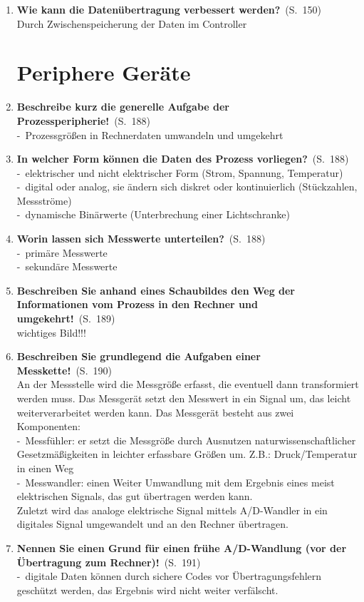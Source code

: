 \documentclass[a4paper,12pt]{article}
\newcommand{\question}[3]{\pagebreak[3]\item {\textbf{#1?}}\ (S.\ #2)#3}
\newcommand{\statement}[3]{\pagebreak[3]\item {\textbf{#1!}}\ (S.\ #2)#3}
\newcommand{\catchword}[1]{\\-\ #1}
\newcommand{\normaltext}[1]{\\#1}
\newcommand{\page}[1]{#1}
\begin{document}
\begin{enumerate}
  \question{Wie kann die Datenübertragung verbessert werden}{\page{150}}
  {
    \normaltext{Durch Zwischenspeicherung der Daten im Controller}
  }

  \newpage
  \section{Periphere Geräte}


  \statement{Beschreibe kurz die generelle Aufgabe der Prozessperipherie}{\page{188}}
  {
    \catchword{Prozessgrößen in Rechnerdaten umwandeln und umgekehrt}
  }

  \question{In welcher Form können die Daten des Prozess vorliegen}{\page{188}}
  {
    \catchword{elektrischer und nicht elektrischer Form (Strom, Spannung, Temperatur)}
    \catchword{digital oder analog, sie ändern sich diskret oder kontinuierlich (Stückzahlen, Messströme)}
    \catchword{dynamische Binärwerte (Unterbrechung einer Lichtschranke)}
  }

  \question{Worin lassen sich Messwerte unterteilen}{\page{188}}
  {
    \catchword{primäre Messwerte}
    \catchword{sekundäre Messwerte}
  }

  \statement{Beschreiben Sie anhand eines Schaubildes den Weg der Informationen
             vom Prozess in den Rechner und umgekehrt}{\page{189}}
  {
    \normaltext{wichtiges Bild!!!}
  }

  \statement{Beschreiben Sie grundlegend die Aufgaben einer Messkette}{\page{190}}
  {
    \normaltext{An der Messstelle wird die Messgröße erfasst, die eventuell dann 
              transformiert werden muss. Das Messgerät setzt den Messwert in ein Signal
              um, das leicht weiterverarbeitet werden kann. Das Messgerät besteht
              aus zwei Komponenten:}
    \catchword{Messfühler: er setzt die Messgröße durch Ausnutzen naturwissenschaftlicher
             Gesetzmäßigkeiten in leichter erfassbare Größen um. Z.B.: Druck/Temperatur in einen Weg} 
    \catchword{Messwandler: einen Weiter Umwandlung mit dem Ergebnis eines meist elektrischen
               Signals, das gut übertragen werden kann.}
    \normaltext{Zuletzt wird das analoge elektrische Signal mittels A/D-Wandler in ein digitales
                Signal umgewandelt und an den Rechner übertragen.}
  }

  \statement{Nennen Sie einen Grund für einen frühe A/D-Wandlung (vor der Übertragung zum Rechner)}{\page{191}} 
  {
    \catchword{digitale Daten können durch sichere Codes vor Übertragungsfehlern geschützt werden,
               das Ergebnis wird nicht weiter verfälscht.} 
  }


\end{enumerate}
\end{document}

